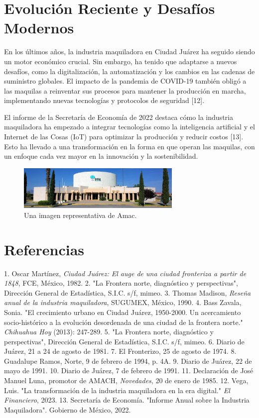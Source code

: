 \section{Evolución Reciente y Desafíos Modernos}

En los últimos años, la industria maquiladora en Ciudad Juárez ha seguido siendo un motor económico crucial. Sin embargo, ha tenido que adaptarse a nuevos desafíos, como la digitalización, la automatización y los cambios en las cadenas de suministro globales. El impacto de la pandemia de COVID-19 también obligó a las maquilas a reinventar sus procesos para mantener la producción en marcha, implementando nuevas tecnologías y protocolos de seguridad [12].

El informe de la Secretaría de Economía de 2022 destaca cómo la industria maquiladora ha empezado a integrar tecnologías como la inteligencia artificial y el Internet de las Cosas (IoT) para optimizar la producción y reducir costos [13]. Esto ha llevado a una transformación en la forma en que operan las maquilas, con un enfoque cada vez mayor en la innovación y la sostenibilidad.

\begin{figure}[h]
    \centering
    \includegraphics[width=0.7\textwidth]{img/Amac.jpg}
    \caption{Una imagen representativa de Amac.}
    \label{fig:amac}
\end{figure}

\section*{Referencias}

1. Oscar Martínez, \textit{Ciudad Juárez: El auge de una ciudad fronteriza a partir de 1848}, FCE, México, 1982.  
2. "La Frontera norte, diagnóstico y perspectivas", Dirección General de Estadística, S.I.C. s/f, mimeo.  
3. Thomas Madison, \textit{Reseña anual de la industria maquiladora}, SUGUMEX, México, 1990.  
4. Bass Zavala, Sonia. "El crecimiento urbano en Ciudad Juárez, 1950-2000. Un acercamiento socio-histórico a la evolución desordenada de una ciudad de la frontera norte." \textit{Chihuahua Hoy} (2013): 247-289.  
5. "La Frontera norte, diagnóstico y perspectivas", Dirección General de Estadística, S.I.C. s/f, mimeo.  
6. Diario de Juárez, 21 a 24 de agosto de 1981.  
7. El Fronterizo, 25 de agosto de 1974.  
8. Guadalupe Ramos, Norte, 9 de febrero de 1994, p. 4A.  
9. Diario de Juárez, 22 de mayo de 1991.  
10. Diario de Juárez, 7 de febrero de 1991.  
11. Declaración de José Manuel Luna, promotor de AMACH, \textit{Novedades}, 20 de enero de 1985.  
12. Vega, Luis. "La transformación de la industria maquiladora en la era digital." \textit{El Financiero}, 2023.  
13. Secretaría de Economía. "Informe Anual sobre la Industria Maquiladora". Gobierno de México, 2022.

